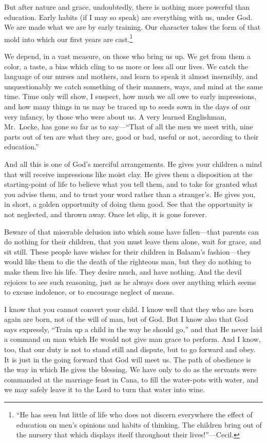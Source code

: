 \documentclass[
]{book}
\begin{document}
But after nature and grace, undoubtedly, there is nothing more powerful than education. Early habits (if I may so speak) are everything with us, under God. We are made what we are by early training. Our character takes the form of that mold into which our first years are cast.\footnote{``He has seen but little of life who does not discern everywhere the effect of education on men's opinions and habits of thinking. The children bring out of the nursery that which displays itself throughout their lives!''---Cecil.}

We depend, in a vast measure, on those who bring us up. We get from them a color, a taste, a bias which cling to us more or less all our lives. We catch the language of our nurses and mothers, and learn to speak it almost insensibly, and unquestionably we catch something of their manners, ways, and mind at the same time. Time only will show, I suspect, how much we all owe to early impressions, and how many things in us may be traced up to seeds sown in the days of our very infancy, by those who were about us. A very learned Englishman, Mr.~Locke, has gone so far as to say---``That of all the men we meet with, nine parts out of ten are what they are, good or bad, useful or not, according to their education.''

And all this is one of God's merciful arrangements. He gives your children a mind that will receive impressions like moist clay. He gives them a disposition at the starting-point of life to believe what you tell them, and to take for granted what you advise them, and to trust your word rather than a stranger's. He gives you, in short, a golden opportunity of doing them good. See that the opportunity is not neglected, and thrown away. Once let slip, it is gone forever.

Beware of that miserable delusion into which some have fallen---that parents can do nothing for their children, that you must leave them alone, wait for grace, and sit still. These people have wishes for their children in Balaam's fashion---they would like them to die the death of the righteous man, but they do nothing to make them live his life. They desire much, and have nothing. And the devil rejoices to see such reasoning, just as he always does over anything which seems to excuse indolence, or to encourage neglect of means.

I know that you cannot convert your child. I know well that they who are born again are born, not of the will of man, but of God. But I know also that God says expressly, ``Train up a child in the way he should go,'' and that He never laid a command on man which He would not give man grace to perform. And I know, too, that our duty is not to stand still and dispute, but to go forward and obey. It is just in the going forward that God will meet us. The path of obedience is the way in which He gives the blessing. We have only to do as the servants were commanded at the marriage feast in Cana, to fill the water-pots with water, and we may safely leave it to the Lord to turn that water into wine.
\end{document}

